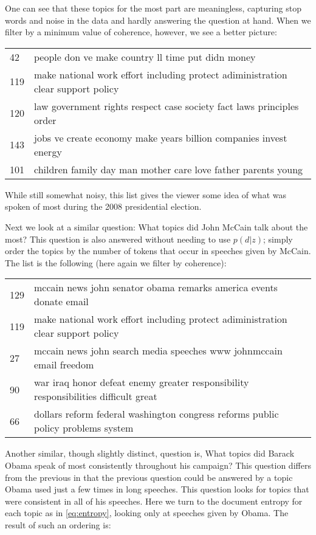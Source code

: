 \documentclass{article}
\begin{document}
One can see that these topics for the most part are meaningless, capturing stop
words and noise in the data and hardly answering the question at hand.  When we
filter by a minimum value of coherence, however, we see a better picture:

\begin{tabular}{l|l}
  42 & people don ve make country ll time put didn money \\
  119 & make national work effort including protect adiministration clear
	support policy \\
  120 & law government rights respect case society fact laws principles order \\
  143 & jobs ve create economy make years billion companies invest energy \\
  101 & children family day man mother care love father parents young \\
\end{tabular}

While still somewhat noisy, this list gives the viewer some idea of what was
spoken of most during the 2008 presidential election.

Next we look at a similar question: What topics did John McCain talk about the
most?  This question is also answered without needing to use $p(d|z)$; simply
order the topics by the number of tokens that occur in speeches given by
McCain.  The list is the following (here again we filter by coherence):

\begin{tabular}{l|l}
  129 & mccain news john senator obama remarks america events donate email \\
  119 & make national work effort including protect adiministration clear
	support policy \\
  27 & mccain news john search media speeches www johnmccain email freedom \\
  90 & war iraq honor defeat enemy greater responsibility responsibilities
	difficult great \\
  66 & dollars reform federal washington congress reforms public policy
	problems system \\
\end{tabular}

Another similar, though slightly distinct, question is, What topics did Barack
Obama speak of most consistently throughout his campaign?  This question
differs from the previous in that the previous question could be answered by a
topic Obama used just a few times in long speeches.  This question looks for
topics that were consistent in all of his speeches.  Here we turn to the
document entropy for each topic as in \eqref{eq:entropy}, looking only at
speeches given by Obama.  The result of such an ordering is:
\end{document}
